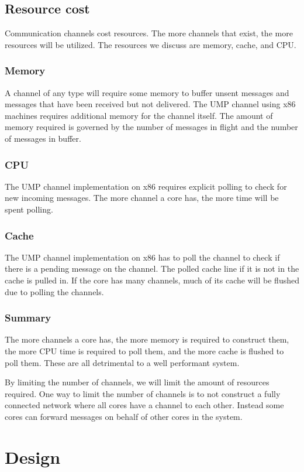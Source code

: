 \documentclass[a4paper,twoside]{report} %
\begin{document}
\section{Resource cost}
Communication channels cost resources.
The more channels that exist, the more resources will be utilized.
The resources we discuss are memory, cache, and CPU.

\subsection{Memory}
A channel of any type will require some memory to buffer unsent messages and
messages that have been received but not delivered.
The UMP channel using x86 machines requires additional memory for the channel itself.
The amount of memory required is governed by the number of messages in flight and
the number of messages in buffer.

\subsection{CPU}
The UMP channel implementation on x86 requires explicit polling
to check for new incoming messages.
The more channel a core has, the more time will be spent polling.

\subsection{Cache}
The UMP channel implementation on x86 has to poll the channel to check
if there is a pending message on the channel.
The polled cache line if it is not in the cache is pulled in.
If the core has many channels, much of its cache will be flushed
due to polling the channels.

\subsection{Summary}
The more channels a core has, the more memory is required to construct them,
the more CPU time is required to poll them, and the more cache is flushed to poll them.
These are all detrimental to a well performant system.

By limiting the number of channels, we will limit the amount of resources required.
One way to limit the number of channels is to not construct a fully connected network
where all cores have a channel to each other.
Instead some cores can forward messages on behalf of other cores in the system.

\chapter{Design}
\end{document}
